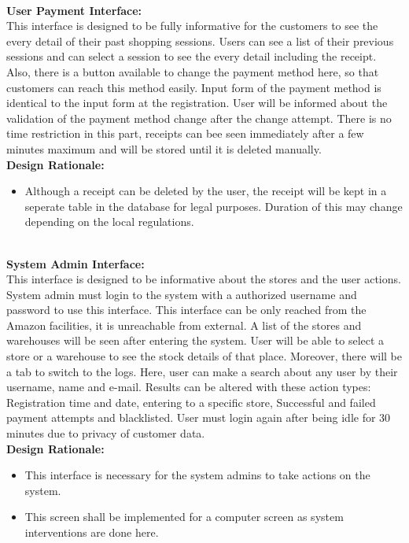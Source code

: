 \documentclass[11pt]{article}
\begin{document}
    \textbf{\\User Payment Interface:\\}
    This interface is designed to be fully informative for
    the customers to see the every detail of their past shopping sessions. Users can see a
    list of their previous sessions and can select a session to see the every detail including
    the receipt. Also, there is a button available to change the payment method here,
    so that customers can reach this method easily. Input form of the payment method
    is identical to the input form at the registration. User will be informed about the
    validation of the payment method change after the change attempt. There is no
    time restriction in this part, receipts can bee seen immediately after a few minutes
    maximum and will be stored until it is deleted manually.
    \textbf{\\Design Rationale:}
    \begin{itemize}
       \item Although a receipt can be deleted by the user, the receipt will be kept in a seperate table in the database for legal purposes.
       Duration of this may change depending on the local regulations.
    \end{itemize}

    \textbf{\\System Admin Interface:\\}
    This interface is designed to be informative about
    the stores and the user actions. System admin must login to the system with a
    authorized username and password to use this interface. This interface can be only
    reached from the Amazon facilities, it is unreachable from external. A list of the
    stores and warehouses will be seen after entering the system. User will be able
    to select a store or a warehouse to see the stock details of that place. Moreover,
    there will be a tab to switch to the logs. Here, user can make a search about any
    user by their username, name and e-mail. Results can be altered with these action
    types: Registration time and date, entering to a specific store, Successful and failed
    payment attempts and blacklisted. User must login again after being idle for 30
    minutes due to privacy of customer data. 
    \textbf{\\Design Rationale:}
    \begin{itemize}
       \item This interface is necessary for the system admins to take actions on the system.
       \item This screen shall be implemented for a computer screen as system interventions are done here.
    \end{itemize}
    
\end{document}
